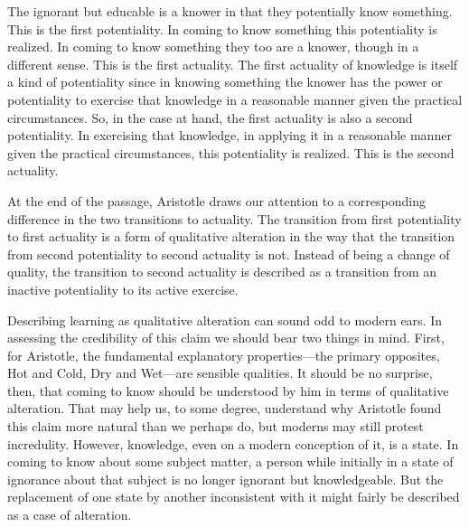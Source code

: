 The ignorant but educable is a knower in that they potentially know something. This is the first potentiality. In coming to know something this potentiality is realized. In coming to know something they too are a knower, though in a different sense. This is the first actuality. The first actuality of knowledge is itself a kind of potentiality since in knowing something the knower has the power or potentiality to exercise that knowledge in a reasonable manner given the practical circumstances. So, in the case at hand, the first actuality is also a second potentiality. In exercising that knowledge, in applying it in a reasonable manner given the practical circumstances, this potentiality is realized. This is the second actuality. 

At the end of the passage, Aristotle draws our attention to a corresponding difference in the two transitions to actuality. The transition from first potentiality to first actuality is a form of qualitative alteration in the way that the transition from second potentiality to second actuality is not. Instead of being a change of quality, the transition to second actuality is described as a transition from an inactive potentiality to its active exercise.

Describing learning as qualitative alteration can sound odd to modern ears. In assessing the credibility of this claim we should bear two things in mind. First, for Aristotle, the fundamental explanatory properties---the primary opposites, Hot and Cold, Dry and Wet---are sensible qualities. It should be no surprise, then, that coming to know should be understood by him in terms of qualitative alteration. That may help us, to some degree, understand why Aristotle found this claim more natural than we perhaps do, but moderns may still protest incredulity. However, knowledge, even on a modern conception of it, is a state. In coming to know about some subject matter, a person while initially in a state of ignorance about that subject is no longer ignorant but knowledgeable. But the replacement of one state by another inconsistent with it might fairly be described as a case of alteration.

